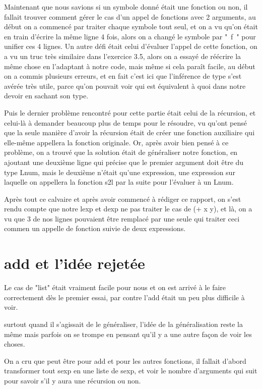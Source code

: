 \documentclass{article}
\begin{document}
Maintenant que nous savions si un symbole donné était une fonction ou non, il fallait trouver comment gérer le cas d'un appel de fonctions avec 2 arguments, au début on a commencé par traiter chaque symbole tout seul, et on a vu qu'on était en train d'écrire la même ligne 4 fois, alors on a changé le symbole par " f " pour unifier ces 4 lignes.
Un autre défi était celui d'évaluer l'appel de cette fonction, on a vu un truc très similaire dans l'exercice 3.5, alors on a essayé de réécrire la même chose en l'adaptant à notre code, mais même si cela paraît facile, au début on a commis plusieurs erreurs, et en fait c'est ici que l'inférence de type s'est avérée très utile, parce qu'on pouvait voir qui est équivalent à quoi dans notre devoir en sachant son type.

Puis le dernier problème rencontré pour cette partie était celui de la récursion, et celui-là à demander beaucoup plus de temps pour le résoudre, vu qu'ont pensé que la seule manière d'avoir la récursion était de créer une fonction auxiliaire qui elle-même appellera la fonction originale. Or, après avoir bien pensé à ce problème, on  a trouvé que la solution était de généraliser notre fonction, en ajoutant une deuxième ligne qui précise que le premier argument doit être du type Lnum, mais le deuxième n'était qu'une expression, une expression sur laquelle on appellera la fonction s2l par la suite pour l'évaluer à un Lnum.

Après tout ce calvaire et après avoir commencé à rédiger ce rapport, on s'est rendu compte que notre lexp et dexp ne pas traiter le cas de (+ x y), et là, on a vu que 3 de nos lignes pouvaient être remplacé par une seule qui traiter ceci commen un appelle de fonction suivie de deux expressions.

\section{add et l'idée rejetée}

Le cas de "list" était vraiment facile pour nous et on est arrivé à le faire correctement dès le premier essai, par contre l'add était un peu plus difficile à voir.

surtout quand il s'agissait de le généraliser, l'idée de la généralisation reste la même mais parfois on se trompe en pensant qu'il y a une autre façon de voir les choses.

On a cru que peut être pour add et pour les autres fonctions, il fallait d'abord transformer tout sexp en une liste de sexp, et voir le nombre d'arguments qui suit pour savoir s'il y aura une récursion ou non.
\end{document}
